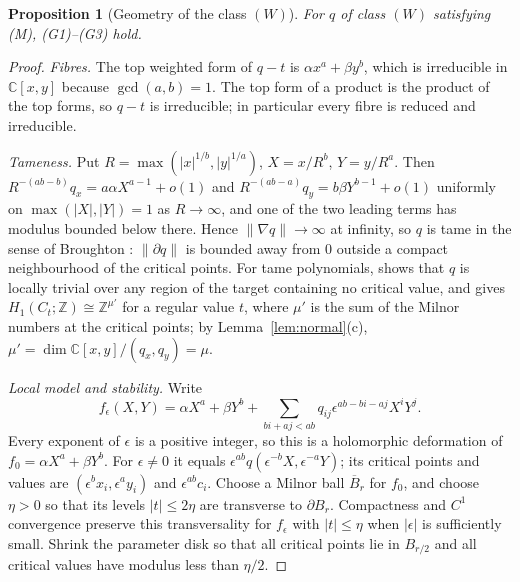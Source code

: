 \documentclass[11pt]{article}
\numberwithin{equation}{section}
\newtheorem{proposition}[theorem]{Proposition}
\theoremstyle{definition}
\theoremstyle{remark}
\newcommand{\C}{\mathbb C}\newcommand{\Q}{\mathbb Q}\newcommand{\R}{\mathbb R}\newcommand{\Z}{\mathbb Z}
\begin{document}
\begin{proposition}[Geometry of the class $(W)$]\label{prop:geometry}
For $q$ of class $(W)$ satisfying \textup{(M)}, \textup{(G1)--(G3)} hold.
\end{proposition}
\begin{proof}
\emph{Fibres.} The top weighted form of $q-t$ is $\alpha x^a+\beta y^b$, which is
irreducible in $\C[x,y]$ because $\gcd(a,b)=1$. The top form of a product is
the product of the top forms, so $q-t$ is irreducible; in particular every
fibre is reduced and irreducible.

\emph{Tameness.} Put $R=\max(|x|^{1/b},|y|^{1/a})$, $X=x/R^b$, $Y=y/R^a$. Then
$R^{-(ab-b)}q_x=a\alpha X^{a-1}+o(1)$ and $R^{-(ab-a)}q_y=b\beta Y^{b-1}+o(1)$
uniformly on $\max(|X|,|Y|)=1$ as $R\to\infty$, and one of the two leading terms
has modulus bounded below there. Hence $\|\nabla q\|\to\infty$ at infinity, so
$q$ is tame in the sense of Broughton \cite[Definition~3.1]{Br}: $\|\partial q\|$
is bounded away from $0$ outside a compact neighbourhood of the critical
points. For tame polynomials, \cite[p.~230]{Br} shows that $q$ is locally
trivial over any region of the target containing no critical value, and
\cite[Theorem~1.2 and p.~231]{Br} gives $H_1(C_t;\Z)\cong\Z^{\mu'}$ for a regular
value $t$, where $\mu'$ is the sum of the Milnor numbers at the critical points;
by Lemma~\ref{lem:normal}(c), $\mu'=\dim\C[x,y]/(q_x,q_y)=\mu$.

\emph{Local model and stability.} Write
\[
 f_\epsilon(X,Y)=\alpha X^a+\beta Y^b+
 \sum_{bi+aj<ab}q_{ij}\epsilon^{ab-bi-aj}X^iY^j.
\]
Every exponent of $\epsilon$ is a positive integer, so this is a holomorphic
deformation of $f_0=\alpha X^a+\beta Y^b$. For $\epsilon\ne0$ it equals
$\epsilon^{ab}q(\epsilon^{-b}X,\epsilon^{-a}Y)$; its critical points and values
are $(\epsilon^b x_i,\epsilon^a y_i)$ and $\epsilon^{ab}c_i$.
Choose a Milnor ball $\overline B_r$ for $f_0$, and choose $\eta>0$ so that its
levels $|t|\le2\eta$ are transverse to $\partial B_r$. Compactness and
$C^1$ convergence preserve this transversality for $f_\epsilon$ with
$|t|\le\eta$ when $|\epsilon|$ is sufficiently small. Shrink the parameter disk
so that all critical points lie in $B_{r/2}$ and all critical values have
modulus less than $\eta/2$.


\end{proof}
\end{document}
